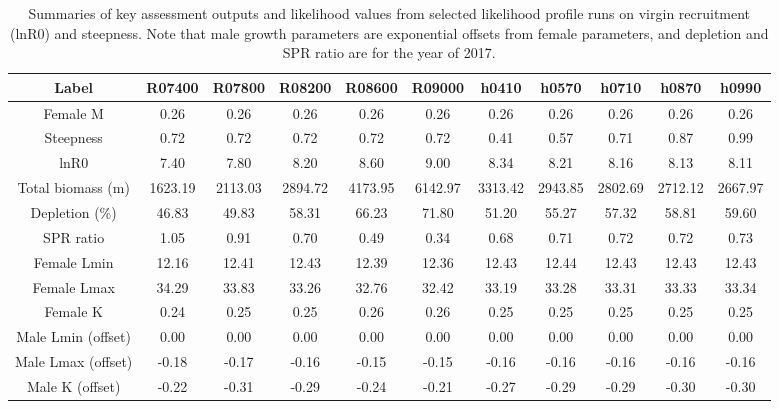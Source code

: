 \documentclass[12pt,]{article}
\begin{document}
\newpage

\begin{landscape}
\begin{table}[ht]
\centering
\caption{Summaries of key assessment outputs 
                                              and likelihood values from selected 
                                              likelihood profile runs on virgin 
                                              recruitment (lnR0) and steepness.  Note that male 
                                              growth parameters are exponential 
                                              offsets from female parameters, and 
                                              depletion and SPR ratio are for the year of 2017.} 
\label{tab:like_profiles}
\begin{tabular}{c|ccccc|ccccc}
  \hline
Label & R07400 & R07800 & R08200 & R08600 & R09000 & h0410 & h0570 & h0710 & h0870 & h0990 \\ 
  \hline
Female M & 0.26 & 0.26 & 0.26 & 0.26 & 0.26 & 0.26 & 0.26 & 0.26 & 0.26 & 0.26 \\ 
  Steepness & 0.72 & 0.72 & 0.72 & 0.72 & 0.72 & 0.41 & 0.57 & 0.71 & 0.87 & 0.99 \\ 
  lnR0 & 7.40 & 7.80 & 8.20 & 8.60 & 9.00 & 8.34 & 8.21 & 8.16 & 8.13 & 8.11 \\ 
  Total biomass (m) & 1623.19 & 2113.03 & 2894.72 & 4173.95 & 6142.97 & 3313.42 & 2943.85 & 2802.69 & 2712.12 & 2667.97 \\ 
  Depletion (\%) & 46.83 & 49.83 & 58.31 & 66.23 & 71.80 & 51.20 & 55.27 & 57.32 & 58.81 & 59.60 \\ 
  SPR ratio & 1.05 & 0.91 & 0.70 & 0.49 & 0.34 & 0.68 & 0.71 & 0.72 & 0.72 & 0.73 \\ 
  Female Lmin & 12.16 & 12.41 & 12.43 & 12.39 & 12.36 & 12.43 & 12.44 & 12.43 & 12.43 & 12.43 \\ 
  Female Lmax & 34.29 & 33.83 & 33.26 & 32.76 & 32.42 & 33.19 & 33.28 & 33.31 & 33.33 & 33.34 \\ 
  Female K & 0.24 & 0.25 & 0.25 & 0.26 & 0.26 & 0.25 & 0.25 & 0.25 & 0.25 & 0.25 \\ 
  Male Lmin (offset) & 0.00 & 0.00 & 0.00 & 0.00 & 0.00 & 0.00 & 0.00 & 0.00 & 0.00 & 0.00 \\ 
  Male Lmax (offset) & -0.18 & -0.17 & -0.16 & -0.15 & -0.15 & -0.16 & -0.16 & -0.16 & -0.16 & -0.16 \\ 
  Male K (offset) & -0.22 & -0.31 & -0.29 & -0.24 & -0.21 & -0.27 & -0.29 & -0.29 & -0.30 & -0.30 \\ 

\end{tabular}
\end{table}
\end{landscape}
\end{document}
